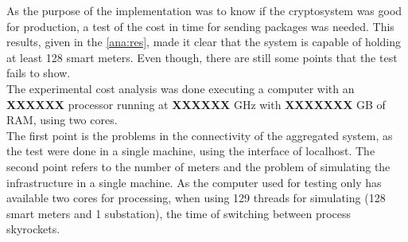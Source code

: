 
   As the purpose of the implementation was to know if the cryptosystem was
   good for production, a test of the cost in time for sending packages was
   needed. This results, given in the \ref{ana:res}, made it clear that
   the system is capable of holding at least 128 smart meters. Even though,
   there are still some points that the test fails to show.\\
   The experimental cost analysis was done executing a computer with an \textbf{XXXXXX} processor running at \textbf{XXXXXX} GHz with \textbf{XXXXXXX} GB of RAM, using two cores.\\
   The first point is the problems in the connectivity of the aggregated system, as the test were done in a single machine, using the interface of localhost.
   The second point refers to the number of meters and the problem of simulating the infrastructure in a single machine. As the computer used for testing only has available two cores for processing, when using 129 threads for simulating (128 smart meters and 1 substation), the time of switching between process skyrockets.
   

